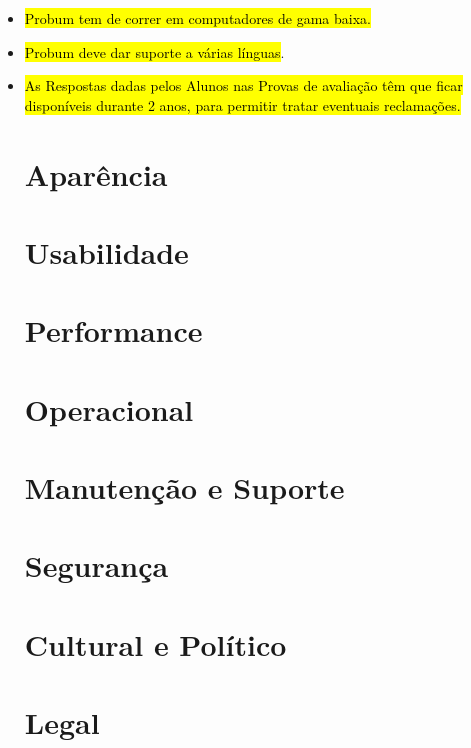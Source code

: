 \begin{itemize}
\item 
\hl{Probum tem de correr em computadores de gama baixa.}

\item
\hl{Probum deve dar suporte a várias línguas}.

\item
\hl{As Respostas dadas pelos Alunos nas Provas de avaliação têm que ficar disponíveis durante 2 anos, para permitir tratar eventuais reclamações.}

























\newpage
\section{Aparência}

\newpage
\section{Usabilidade}

\newpage
\section{Performance}

\newpage
\section{Operacional}


\newpage
\section{Manutenção e Suporte}


\newpage
\section{Segurança}


\newpage
\section{Cultural e Político}

\newpage
\section{Legal}




\end{itemize}